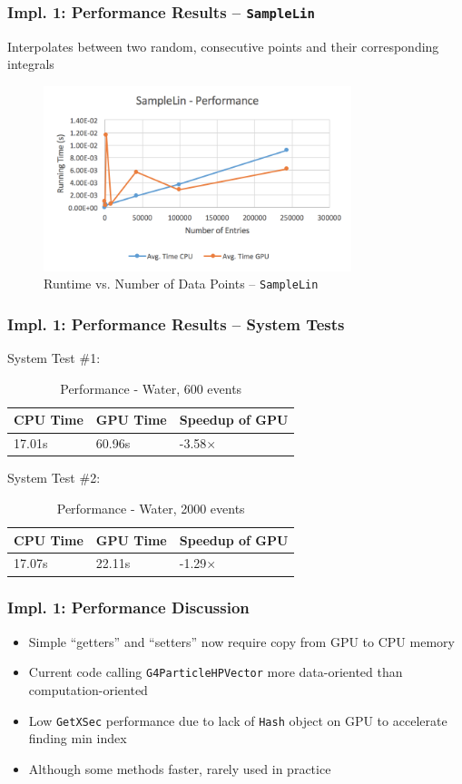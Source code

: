 \documentclass{beamer}
\begin{document}
\begin{frame}
\frametitle{Impl. 1: Performance Results -- \texttt{SampleLin}}
Interpolates between two random, consecutive points and their corresponding integrals
\begin{figure}
\centering
\includegraphics[width=0.8\textwidth]{images/samplelin_line.png}
\caption{Runtime vs. Number of Data Points -- \texttt{SampleLin}}
\end{figure}
\end{frame}

\begin{frame}
\frametitle{Impl. 1: Performance Results -- System Tests}
System Test \#1:
\begin{table}
	\begin{tabular}{lll}
	\toprule
	\bf CPU Time&\bf  GPU Time&\bf Speedup of GPU\\\midrule
	17.01s&60.96s&-3.58$\times$\\\bottomrule
	\end{tabular}
	\caption{Performance - Water, 600 events}
\end{table}
System Test \#2:
\begin{table}
	\begin{tabular}{lll}
	\toprule
	\bf CPU Time&\bf  GPU Time&\bf Speedup of GPU\\\midrule
	17.07s&22.11s&-1.29$\times$\\\bottomrule
	\end{tabular}
	\caption{Performance - Water, 2000 events}
\end{table}
\end{frame}

\begin{frame}
\frametitle{Impl. 1: Performance Discussion}
\begin{itemize}
\item Simple ``getters'' and ``setters'' now require copy from GPU to CPU memory
\item Current code calling \texttt{G4ParticleHPVector} more data-oriented than computation-oriented
\item Low \texttt{GetXSec} performance due to lack of \texttt{Hash} object on GPU to accelerate finding min index
\item Although some methods faster, rarely used in practice
\end{itemize}
\end{frame}
\end{document}
